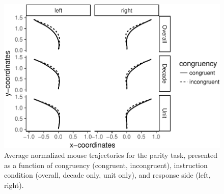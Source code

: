 \documentclass[english,man]{apa6}
\theoremstyle{definition}
\theoremstyle{definition}
\theoremstyle{definition}
\theoremstyle{remark}
\begin{document}
\begin{figure}
\centering
\includegraphics{paper_files/figure-latex/parityTrajectories-1.pdf}
\caption{\label{fig:parityTrajectories}Average normalized mouse trajectories
for the parity task, presented as a function of congruency (congruent,
incongruent), instruction condition (overall, decade only, unit only),
and response side (left, right).}
\end{figure}
\end{document}
